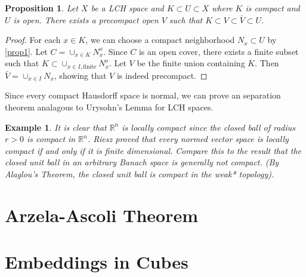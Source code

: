 \documentclass[12pt]{article}
\newtheorem{proposition}{Proposition}[section]
\newtheorem{example}{Example}[section]
\begin{document}
\begin{proposition}
 Let $X$ be a LCH space and $K \subset U \subset X$ where $K$ is compact and $U$ is open. There exists a precompact open $V$ such that $K \subset V \subset \bar{V} \subset U$.
\end{proposition}

\begin{proof}
 For each $x \in K$, we can choose a compact neighborhood $N_x \subset U$ by \ref{prop1}. Let $C = \cup_{x \in K} N_x^o$. Since $C$ is an open cover, there exists a finite subset such that 
 $K \subset \cup_{x \in I, \text{finite}} N_x^o$. Let $V$ be the finite union containing $K$. Then $\bar{V} = \cup_{x \in I} N_x$, showing that $V$ is indeed precompact.
\end{proof}

Since every compact Hausdorff space is normal, we can prove an separation theorem analagous to Urysohn's Lemma for LCH spaces.

\begin{example}
 It is clear that $\mathbb{R}^n$ is locally compact since the closed ball of radius $r > 0$ is compact in $\mathbb{R}^n$. Riesz proved that every normed vector space is locally compact if and only if it is finite dimensional. Compare this to the result that the closed unit ball in an arbitrary Banach space is generally not compact. (By Alaglou's Theorem, the closed unit ball is compact in the weak* topology).
\end{example}

\section{Arzela-Ascoli Theorem}

\section{Embeddings in Cubes}
\end{document}
